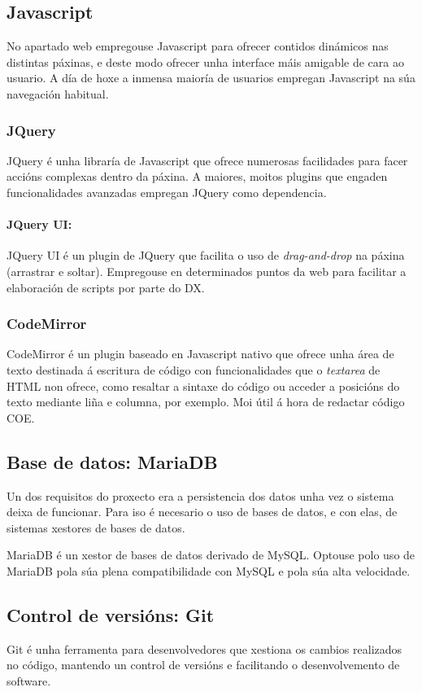\subsection{Javascript}
No apartado web empregouse Javascript\cite{javascript} para ofrecer contidos
dinámicos nas distintas páxinas, e deste modo ofrecer unha interface máis
amigable de cara ao usuario. A día de hoxe a inmensa maioría de usuarios
empregan Javascript na súa navegación habitual.

\subsubsection{JQuery}
JQuery\cite{javascript} é unha libraría de Javascript que ofrece numerosas
facilidades para facer accións complexas dentro da páxina. A maiores, moitos
plugins que engaden funcionalidades avanzadas empregan JQuery como dependencia.

\paragraph{JQuery UI:}
JQuery UI é un plugin de JQuery que facilita o uso de \textit{drag-and-drop} na
páxina (arrastrar e soltar). Empregouse en determinados puntos da web para
facilitar a elaboración de scripts por parte do DX.

\subsubsection{CodeMirror}
CodeMirror\cite{codemirror} é un plugin baseado en Javascript nativo que ofrece
unha área de texto destinada á escritura de código con funcionalidades que o
\textit{textarea} de HTML non ofrece, como resaltar a sintaxe do código ou
acceder a posicións do texto mediante liña e columna, por exemplo. Moi útil á
hora de redactar código COE.

\subsection{Base de datos: MariaDB}
Un dos requisitos do proxecto era a persistencia dos datos unha vez o sistema
deixa de funcionar. Para iso é necesario o uso de bases de datos, e con elas, de
sistemas xestores de bases de datos.

MariaDB\cite{mariadb} é un xestor de bases de datos derivado de MySQL. Optouse
polo uso de MariaDB pola súa plena compatibilidade con MySQL e pola súa alta
velocidade.

\subsection{Control de versións: Git}
Git\cite{git} é unha ferramenta para desenvolvedores que xestiona os cambios
realizados no código, mantendo un control de versións e facilitando o
desenvolvemento de software.

